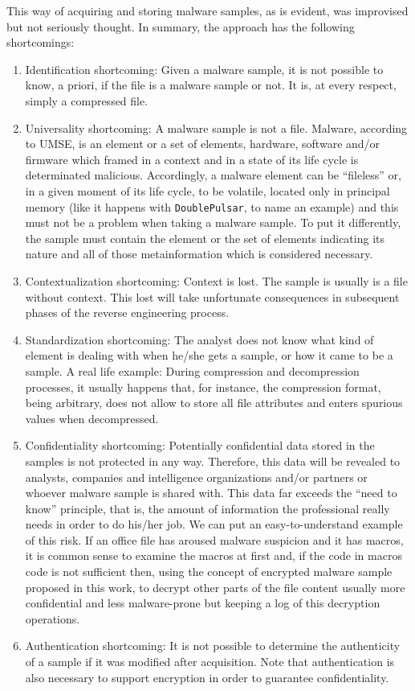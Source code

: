 This way of acquiring and storing malware samples, as is evident, was
improvised but not seriously thought. In summary, the approach has the
following shortcomings:
\begin{enumerate}
\item Identification shortcoming: Given a malware sample, it is not possible
  to know, a priori, if the file is a malware sample or not. It is, at every
  respect, simply a compressed file.

\item Universality shortcoming: A malware sample is not a file. Malware,
  according to UMSE, is an element or a set of elements, hardware, software
  and/or firmware which framed in a context and in a state of its life cycle
  is determinated malicious. Accordingly, a malware element can be
  ``fileless'' or, in a given moment of its life cycle, to be volatile,
  located only in principal memory (like it happens with
  \texttt{DoublePulsar}, to name an example) and this must not be a problem
  when taking a malware sample. To put it differently, the sample must contain
  the element or the set of elements indicating its nature and all of those
  metainformation which is considered necessary.
  
\item Contextualization shortcoming: Context is lost. The sample is usually is
  a file without context. This lost will take unfortunate consequences in
  subsequent phases of the reverse engineering process.

\item Standardization shortcoming: The analyst does not know what kind of
  element is dealing with when he/she gets a sample, or how it came to be a
  sample. A real life example: During compression and decompression processes,
  it usually happens that, for instance, the compression format, being
  arbitrary, does not allow to store all file attributes and enters spurious
  values when decompressed.

\item Confidentiality shortcoming: Potentially confidential data stored in the
  samples is not protected in any way. Therefore, this data will be revealed
  to analysts, companies and intelligence organizations and/or partners or
  whoever malware sample is shared with. This data far exceeds the ``need to
  know'' principle, that is, the amount of information the professional really
  needs in order to do his/her job. We can put an easy-to-understand example
  of this risk. If an office file has aroused malware suspicion and it has
  macros, it is common sense to examine the macros at first and, if the code
  in macros code is not sufficient then, using the concept of encrypted
  malware sample proposed in this work, to decrypt other parts of the file
  content usually more confidential and less malware-prone but keeping a log
  of this decryption operations.
  
\item Authentication shortcoming: It is not possible to determine the
  authenticity of a sample if it was modified after acquisition. Note that
  authentication is also necessary to support encryption in order to guarantee
  confidentiality.
\end{enumerate}

